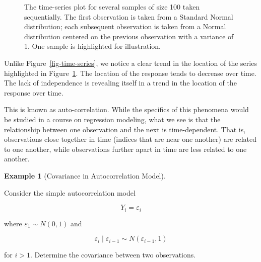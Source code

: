 \documentclass[
  letterpaper,
  DIV=11,
  numbers=noendperiod]{scrreprt}
\theoremstyle{definition}
\theoremstyle{plain}
\theoremstyle{definition}
\newtheorem{example}{Example}[chapter]
\theoremstyle{remark}
\begin{document}
\begin{figure}


\caption{\label{fig-time-series-auto}The time-series plot for several
samples of size 100 taken sequentially. The first observation is taken
from a Standard Normal distribution; each subsequent observation is
taken from a Normal distribution centered on the previous observation
with a variance of 1. One sample is highlighted for illustration.}

\end{figure}%

Unlike Figure~\ref{fig-time-series}, we notice a clear trend in the
location of the series highlighted in Figure~\ref{fig-time-series-auto}.
The location of the response tends to decrease over time. The lack of
independence is revealing itself in a trend in the location of the
response over time.

This is known as auto-correlation. While the specifics of this phenomena
would be studied in a course on regression modeling, what we see is that
the relationship between one observation and the next is time-dependent.
That is, observations close together in time (indices that are near one
another) are related to one another, while observations further apart in
time are less related to one another.

\begin{example}[Covariance in Autocorrelation
Model]\protect\hypertarget{exm-covariance-auto}{}\label{exm-covariance-auto}

Consider the simple autocorrelation model

\[Y_i = \varepsilon_i\]

where \(\varepsilon_1 \sim N(0, 1)\) and

\[\varepsilon_i \mid \varepsilon_{i-1} \sim N\left(\varepsilon_{i-1}, 1\right)\]

for \(i > 1\). Determine the covariance between two observations.

\end{example}
\end{document}
